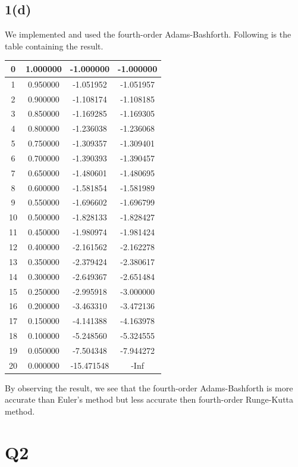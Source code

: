 \documentclass{article}
\begin{document}
\subsection*{1(d)}
We implemented and used the fourth-order  Adams-Bashforth. Following is the table containing the result.
\begin{center}
\begin{tabular}{|c|c|c|c|}
\hline
0 & 1.000000 & -1.000000 & -1.000000 \\ \hline 
1 & 0.950000 & -1.051952 & -1.051957 \\ \hline 
2 & 0.900000 & -1.108174 & -1.108185 \\ \hline 
3 & 0.850000 & -1.169285 & -1.169305 \\ \hline 
4 & 0.800000 & -1.236038 & -1.236068 \\ \hline 
5 & 0.750000 & -1.309357 & -1.309401 \\ \hline 
6 & 0.700000 & -1.390393 & -1.390457 \\ \hline 
7 & 0.650000 & -1.480601 & -1.480695 \\ \hline 
8 & 0.600000 & -1.581854 & -1.581989 \\ \hline 
9 & 0.550000 & -1.696602 & -1.696799 \\ \hline 
10 & 0.500000 & -1.828133 & -1.828427 \\ \hline 
11 & 0.450000 & -1.980974 & -1.981424 \\ \hline 
12 & 0.400000 & -2.161562 & -2.162278 \\ \hline 
13 & 0.350000 & -2.379424 & -2.380617 \\ \hline 
14 & 0.300000 & -2.649367 & -2.651484 \\ \hline 
15 & 0.250000 & -2.995918 & -3.000000 \\ \hline 
16 & 0.200000 & -3.463310 & -3.472136 \\ \hline 
17 & 0.150000 & -4.141388 & -4.163978 \\ \hline 
18 & 0.100000 & -5.248560 & -5.324555 \\ \hline 
19 & 0.050000 & -7.504348 & -7.944272 \\ \hline 
20 & 0.000000 & -15.471548 & -Inf \\ \hline 
\end{tabular}
\end{center}
By observing the result, we see that the fourth-order Adams-Bashforth is more accurate than Euler's method but less accurate then fourth-order Runge-Kutta method.
\section{Q2}
\end{document}
